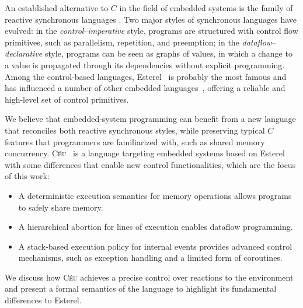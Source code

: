 \documentclass{acm_proc_article-sp}
\newcommand{\CEU}{\textsc{C\'{e}u}\xspace}
\newcommand{\1}{\;}
\newcommand{\2}{\;\;}
\newcommand{\3}{\;\;\;}
\newcommand{\5}{\;\;\;\;\;}
\begin{document}

An established alternative to $C$ in the field of embedded systems is the 
family of reactive synchronous languages \cite{rp.twelve}.
%
Two major styles of synchronous languages have evolved:
in the \emph{control}--\emph{imperative} style, programs are structured with 
control flow primitives, such as parallelism, repetition, and preemption;
in the \emph{dataflow}--\emph{declarative} style, programs can be seen as 
graphs of values, in which a change to a value is propagated through its 
dependencies without explicit programming.
%
Among the control-based languages, Esterel~\cite{esterel.ieee91} is probably 
the most famous and has influenced a number of other embedded 
languages~\cite{wsn.sol,wsn.osm,pret}, offering a reliable and high-level set 
of control primitives.


We believe that embedded-system programming can benefit from a new language 
that reconciles both reactive synchronous styles, while preserving typical $C$ 
features that programmers are familiarized with, such as shared memory 
concurrency.
%
\CEU~\cite{ceu.sensys13}
is a language targeting embedded systems based on Esterel with some differences 
that enable new control functionalities, which are the focus of this work:
%
\begin{itemize}
\item A deterministic execution semantics for memory operations allows programs 
to safely share memory.
%
\item A hierarchical abortion for lines of execution enables dataflow 
programming.
%
\item A stack-based execution policy for internal events provides advanced 
control mechanisms, such as exception handling and a limited form of 
coroutines.
\end{itemize}
%
We discuss how \CEU achieves a precise control over reactions to the 
environment and present a formal semantics of the language to highlight its 
fundamental differences to Esterel.
\end{document}
